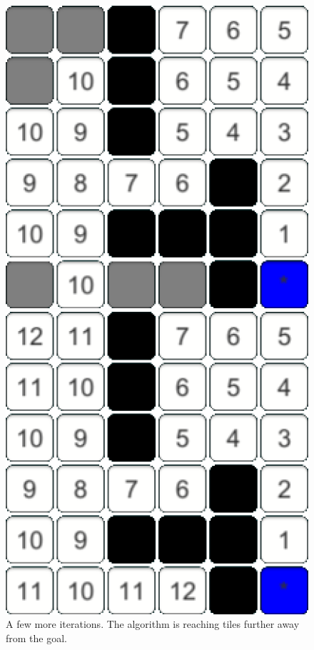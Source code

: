 \documentclass[conference]{IEEEtran}
\begin{document}
\begin{figure}[h]
\begin{minipage}[t]{0.3\linewidth}
\centering
\includegraphics[width=1\textwidth]{images/intro/more.png}
\caption{A few more iterations. The algorithm is reaching tiles further away from the goal.}
\end{minipage}
\hfill
\begin{minipage}[t]{0.3\linewidth}
\centering
\includegraphics[width=1\textwidth]{images/intro/final.png}

\end{minipage}
\end{figure}
\end{document}
